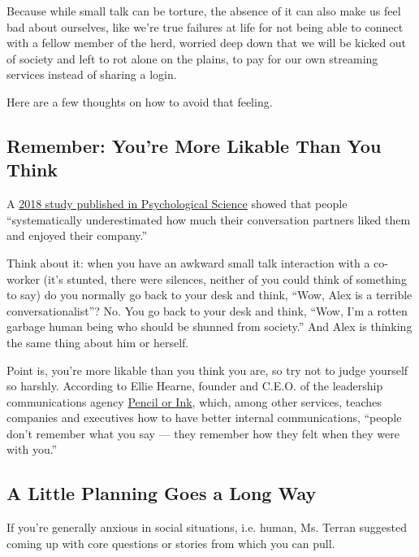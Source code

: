 Because while small talk can be torture, the absence of it can also make
us feel bad about ourselves, like we're true failures at life for not
being able to connect with a fellow member of the herd, worried deep
down that we will be kicked out of society and left to rot alone on the
plains, to pay for our own streaming services instead of sharing a
login.

Here are a few thoughts on how to avoid that feeling.

\hypertarget{remember-youre-more-likable-than-you-think}{%
\subsection{Remember: You're More Likable Than You
Think}\label{remember-youre-more-likable-than-you-think}}

A
\href{https://www.nytimes.com/2018/09/23/smarter-living/how-to-be-more-likeable.html}{2018
study published in Psychological Science} showed that people
``systematically underestimated how much their conversation partners
liked them and enjoyed their company.''

Think about it: when you have an awkward small talk interaction with a
co-worker (it's stunted, there were silences, neither of you could think
of something to say) do you normally go back to your desk and think,
``Wow, Alex is a terrible conversationalist''? No. You go back to your
desk and think, ``Wow, I'm a rotten garbage human being who should be
shunned from society.'' And Alex is thinking the same thing about him or
herself.

Point is, you're more likable than you think you are, so try not to
judge yourself so harshly. According to Ellie Hearne, founder and C.E.O.
of the leadership communications agency
\href{https://www.pencilorink.com/}{Pencil or Ink}, which, among other
services, teaches companies and executives how to have better internal
communications, ``people don't remember what you say --- they remember
how they felt when they were with you.''

\hypertarget{a-little-planning-goes-a-long-way}{%
\subsection{A Little Planning Goes a Long
Way}\label{a-little-planning-goes-a-long-way}}

If you're generally anxious in social situations, i.e. human, Ms. Terran
suggested coming up with core questions or stories from which you can
pull.

